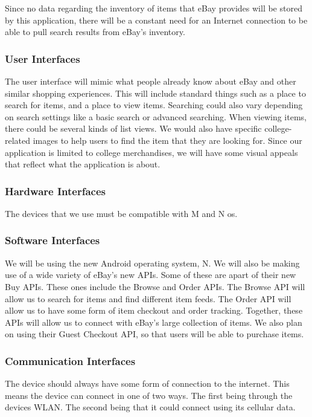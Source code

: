 \documentclass[journal,compsoc, 10pt, draftclsnofoot, onecolumn]{IEEEtran}
\begin{document}
Since no data regarding the inventory of items that eBay provides will be stored
 by this application, there will be a constant need for an Internet connection 
to be able to pull search results from eBay's inventory. 

\subsubsection{User Interfaces}

The user interface will mimic what people already know about eBay and other 
similar shopping experiences. This will include standard things such as a place 
to search for items, and a place to view items. Searching 
could also vary depending on search settings like a basic search or advanced 
searching. When viewing items, there could be several kinds of list views. We 
would also have specific college-related images to help users to find the item 
that they are looking for. Since our application is limited to college 
merchandises, we will have some visual appeals that reflect what the application
 is about.

\subsubsection{Hardware Interfaces}

The devices that we use must be compatible with M and N os. 

\subsubsection{Software Interfaces}

We will be using the new Android operating system, N. We will also be making use
 of a wide variety of eBay's new APIs. Some of these are apart of their new Buy 
APIs. These ones include the Browse and Order APIs. The Browse API will allow us
 to search for items and find different item feeds. The Order API will allow us 
to have some form of item checkout and order tracking. Together, these APIs
 will allow us to connect with eBay's large collection of items. We also plan 
on using their Guest Checkout API, so that users will be able to purchase items.

\subsubsection{Communication Interfaces}

The device should always have some form of connection to the internet. This 
means the device can connect in one of two ways. The first being through the 
devices WLAN. The second being that it could connect using its cellular data.
\end{document}
